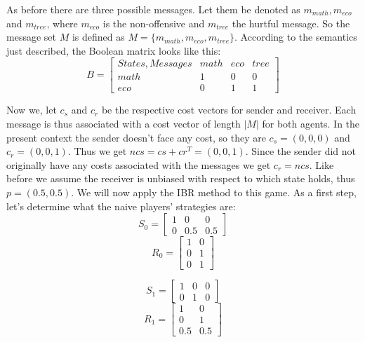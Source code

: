 \documentclass{article}
\begin{document}
As before there are three possible messages. Let them be denoted as $m_{math},m_{eco}$ and $m_{tree}$, where $m_{eco}$ is the non-offensive and $m_{tree}$ the hurtful message. So the message set $M$ is defined as $M=\{m_{math},m_{eco},m_{tree}\}$. According to the semantics just described, the Boolean matrix looks like this:\\
\begin{equation*}
B =
\begin{bmatrix}

States, Messages & math & eco & tree \\
math             & 1    & 0   & 0    \\
eco              & 0    & 1   & 1
\end{bmatrix}
\end{equation*}

Now we, let $c_s$ and $c_r$ be the respective cost vectors for sender and receiver. Each message is thus associated with a cost vector of length $|M|$ for both agents. In the present context the sender doesn't face any cost, so they are $c_s=(0,0,0)$ and $c_r=(0,0,1)$. Thus we get $ncs=cs + cr^T=(0,0,1)$. Since the sender did not originally have any costs associated with the messages we get $c_r=ncs$. Like before we assume the receiver is unbiased with respect to which state holds, thus $p=(0.5,0.5)$.
We will now apply the IBR method to this game. As a first step, let's determine what the naive players' strategies are:\\
\begin{equation*}
S_0=
\begin{bmatrix}
1 & 0 & 0\\
0 & 0.5 & 0.5
\end{bmatrix}
\end{equation*}
\begin{equation*}
R_0=
\begin{bmatrix}
1 & 0\\
0 & 1\\
0 & 1
\end{bmatrix}
\end{equation*}

\begin{equation*}
S_1=
\begin{bmatrix}
1 & 0 & 0\\
0 & 1 & 0
\end{bmatrix}
\end{equation*}
\begin{equation*}
R_1=
\begin{bmatrix}
1 & 0\\
0 & 1\\
0.5 & 0.5
\end{bmatrix}
\end{equation*}
\end{document}
